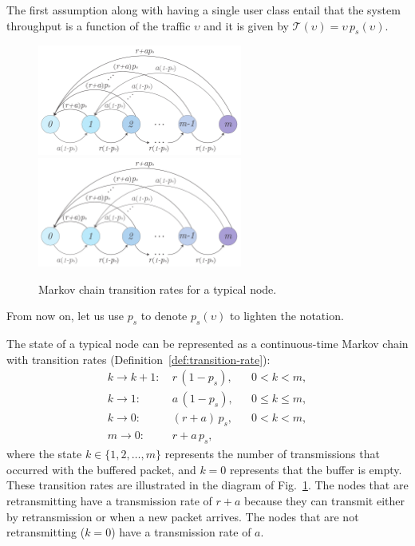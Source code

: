 The first assumption along with having a single user class entail that the system throughput is a function of the traffic $\upsilon$ and it is given by $\mathscr{T}(\upsilon) = \upsilon\,p_s(\upsilon)$.

\begin{figure}[htb]
    \centering
    \if{}
        \includegraphics[width=0.6\textwidth]{Figures/Ch6_markch.pdf}
    \else
        \includegraphics[draft,width=0.6\textwidth]{Figures/Ch6_markch.pdf}
    \fi
    \caption{Markov chain transition rates for a typical node.}
    \label{fig:markov_diagram}
\end{figure}

From now on, let us use $p_s$ to denote $p_s(\upsilon)$ to lighten the notation.

The state of a typical node can be represented as a continuous-time Markov chain with transition rates (Definition~\ref{def:transition-rate}):
\begin{align*}
    k \to k+1:&~ r\,(1-p_s), && 0 < k < m, \\
    k \to 1:&~ a\,(1-p_s),   && 0 \le k \le m, \\
    k \to 0:&~ (r + a)\,p_s, && 0 < k < m, \\
    m \to 0:&~ r + a\,p_s,
\end{align*}%
 {where the state $k\in\{1,2,\dots,m\}$ represents the number of transmissions that occurred with the buffered packet, and $k=0$ represents that the buffer is empty.}
%
These transition rates are illustrated in the diagram of Fig.~\ref{fig:markov_diagram}.
The nodes that are retransmitting have a transmission rate of $r+a$ because they can transmit either by retransmission or when a new packet arrives.
%
The nodes that are not retransmitting ($k=0$) have a transmission rate of $a$.


